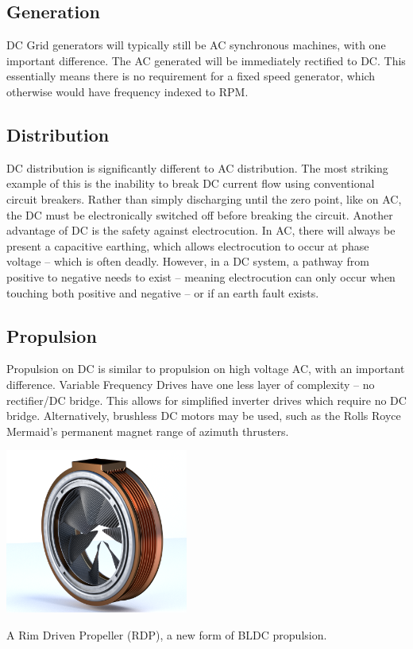 \documentclass[11pt,a4paper]{article}
\begin{document}
\subsection*{Generation}
DC Grid generators will typically still be AC synchronous machines, with one important difference. The AC generated will be immediately rectified to DC. This essentially means there is no requirement for a fixed speed generator, which otherwise would have frequency indexed to RPM.
\subsection*{Distribution}
DC distribution is significantly different to AC distribution. The most striking example of this is the inability to break DC current flow using conventional circuit breakers. Rather than simply discharging until the zero point, like on AC, the DC must be electronically switched off before breaking the circuit. Another advantage of DC is the safety against electrocution. In AC, there will always be present a capacitive earthing, which allows electrocution to occur at phase voltage -- which is often deadly. However, in a DC system, a pathway from positive to negative needs to exist -- meaning electrocution can only occur when touching both positive and negative -- or if an earth fault exists.
\subsection*{Propulsion}
Propulsion on DC is similar to propulsion on high voltage AC, with an important difference. Variable Frequency Drives have one less layer of complexity -- no rectifier/DC bridge. This allows for simplified inverter drives which require no DC bridge. Alternatively, brushless DC motors may be used, such as the Rolls Royce Mermaid's permanent magnet range of azimuth thrusters.
\begin{center}
\includegraphics[width=6cm]{rdp}\par
A Rim Driven Propeller (RDP), a new form of BLDC propulsion.
\end{center}
\end{document}
